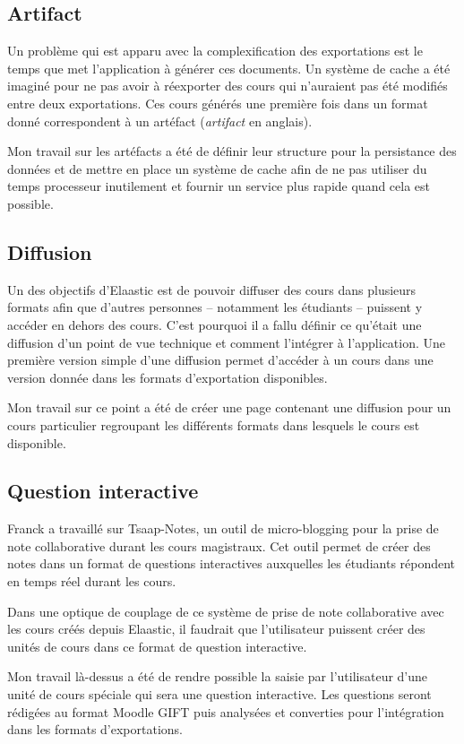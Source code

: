 \subsection{Artifact}
Un problème qui est apparu avec la complexification des exportations est le
temps que met l'application à générer ces documents. Un système de cache a été
imaginé pour ne pas avoir à réexporter des cours qui n'auraient pas été modifiés
entre deux exportations. Ces cours générés une première fois dans un format donné
correspondent à un artéfact ({\em artifact} en anglais).

Mon travail sur les artéfacts a été de définir leur structure pour la
persistance des données et de mettre en place un système de cache afin de ne
pas utiliser du temps processeur inutilement et fournir un service plus rapide
quand cela est possible.

\subsection{Diffusion}
Un des objectifs d'Elaastic est de pouvoir diffuser des cours dans plusieurs
formats afin que d'autres personnes -- notamment les étudiants -- puissent y
accéder en dehors des cours. C'est pourquoi il a fallu définir ce qu'était une
diffusion d'un point de vue technique et comment l'intégrer à l'application. Une
première version simple d'une diffusion permet d'accéder à un cours dans
une version donnée dans les formats d'exportation disponibles.

Mon travail sur ce point a été de créer une page contenant une diffusion pour un
cours particulier regroupant les différents formats dans lesquels le cours est
disponible.

\subsection{Question interactive}
Franck a travaillé sur Tsaap-Notes, un outil de micro-blogging pour la prise de
note collaborative durant les cours magistraux. Cet outil permet de créer des
notes dans un format de questions interactives auxquelles les étudiants
répondent en temps réel durant les cours.

Dans une optique de couplage de ce système de prise de note collaborative avec
les cours créés depuis Elaastic, il faudrait que l'utilisateur puissent créer des
unités de cours dans ce format de question interactive.

Mon travail là-dessus a été de rendre possible la saisie par
l'utilisateur d'une unité de cours spéciale qui sera une question interactive.
Les questions seront rédigées au format Moodle GIFT puis analysées et converties
pour l'intégration dans les formats d'exportations.

